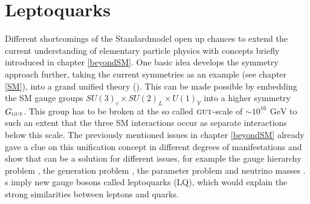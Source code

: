 \section{Leptoquarks}\label{LQmodels}
Different shortcomings of the Standardmodel open up chances to extend the current understanding of elementary particle physics with concepts briefly introduced in chapter \ref{beyondSM}. One basic idea develops the symmetry approach further, taking the current symmetries as an example (see chapter \ref{SM}), into a grand unified theory ({\GUT}). This can be made possible by embedding the SM gauge groups $SU(3)_c\times SU(2)_L\times U(1)_Y$ into a higher symmetry $G_\text{{\textsc{gut}}}$. This group has to be broken at the so called ${\textsc{gut}}$-scale of $\sim 10^{16}\,\SI{}{\giga\electronvolt}$ to such an extent that the three SM interactions occur as separate interactions below this scale. \cite{PhysTeV} The previously mentioned issues in chapter \ref{beyondSM} already gave a clue on this unification concept in different degrees of manifestations and show that {\GUT} can be a solution for different issues, for example the gauge hierarchy problem \cite{hierarchyproblem}\cite{issuesGUT}, the generation problem \cite{issuesGUT}, the parameter problem \cite{issuesGUT} and neutrino masses \cite{neutrinoAndGUT}. {\GUT}s imply new gauge bosons called leptoquarks (LQ), which would explain the strong similarities between leptons and quarks. \cite{Nagashima}
%
%
